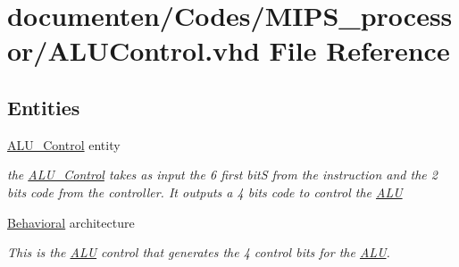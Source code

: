 \hypertarget{_a_l_u_control_8vhd}{\section{documenten/\-Codes/\-M\-I\-P\-S\-\_\-processor/\-A\-L\-U\-Control.vhd File Reference}
\label{_a_l_u_control_8vhd}
}
\subsection*{Entities}
\begin{DoxyCompactItemize}
\item 
\hyperlink{class_a_l_u___control}{A\-L\-U\-\_\-\-Control} entity
\begin{DoxyCompactList}\small\item\em the \hyperlink{class_a_l_u___control}{A\-L\-U\-\_\-\-Control} takes as input the 6 first bit\-S from the instruction and the 2 bits code from the controller. It outputs a 4 bits code to control the \hyperlink{class_a_l_u}{A\-L\-U} \end{DoxyCompactList}\item 
\hyperlink{class_a_l_u___control_1_1_behavioral}{Behavioral} architecture
\begin{DoxyCompactList}\small\item\em This is the \hyperlink{class_a_l_u}{A\-L\-U} control that generates the 4 control bits for the \hyperlink{class_a_l_u}{A\-L\-U}. \end{DoxyCompactList}\end{DoxyCompactItemize}
